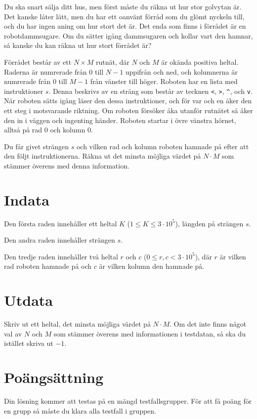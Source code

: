 \noindent
Du ska snart sälja ditt hus, men först måste du räkna ut hur stor golvytan är. Det 
kanske låter lätt, men du har ett oanvänt förråd som du glömt nyckeln till,
och du har ingen aning om hur stort det är. Det enda som finns i förrådet är en robotdammsugare.
Om du sätter igång dammsugaren och kollar vart den hamnar, så kanske du kan räkna ut hur 
stort förrådet är?

Förrådet består av ett $N \times M$ rutnät, där $N$ och $M$ är okända positiva heltal. Raderna är numrerade från $0$ till $N-1$ uppifrån 
och ned, och kolumnerna är numrerade från $0$ till $M-1$ från vänster till höger. Roboten 
har en lista med instruktioner $s$. Denna beskrivs av en sträng som består av tecknen \verb|<|, \verb|>|, \verb|^|, 
och \verb|v|. När roboten sätts igång läser den dessa instruktioner,
och för var och en åker den ett steg i motsvarande riktning. Om roboten försöker åka utanför rutnätet så åker 
den in i väggen och ingenting händer. Roboten startar i övre vänstra hörnet, alltså på 
rad $0$ och kolumn $0$.

Du får givet strängen $s$ och vilken rad och kolumn roboten hamnade på efter att den följt instruktionerna.
Räkna ut det minsta möjliga värdet på $N\cdot M$ som stämmer överens med denna information.


\section*{Indata}
Den första raden innehåller ett heltal $K$ ($1 \leq K \leq 3 \cdot 10^5$), längden på strängen $s$.

Den andra raden innehåller strängen $s$.

Den tredje raden innehåller två heltal $r$ och $c$ ($0 \leq r,c < 3 \cdot 10^5$), där
$r$ är vilken rad roboten hamnade på och $c$ är vilken kolumn den hamnade på.

\section*{Utdata}
Skriv ut ett heltal, det minsta möjliga värdet på $N \cdot M$. Om det inte finns något val av 
$N$ och $M$ som stämmer överens med informationen i testdatan, så ska du istället skriva 
ut $-1$. 

\section*{Poängsättning}
Din lösning kommer att testas på en mängd testfallsgrupper.
För att få poäng för en grupp så måste du klara alla testfall i gruppen.

